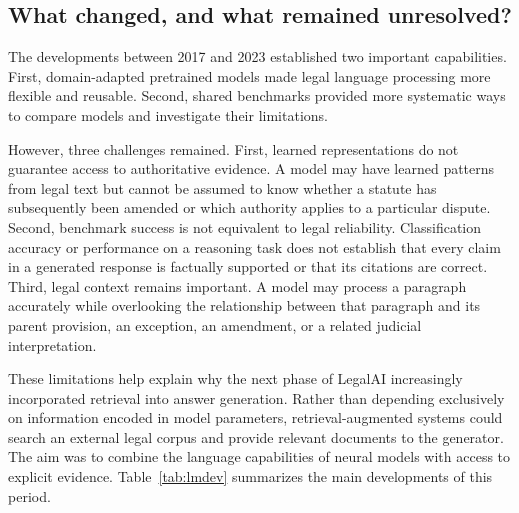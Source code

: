 \subsection{What changed, and what remained unresolved?}

The developments between 2017 and 2023 established two important capabilities. First, domain-adapted
pretrained models made legal language processing more flexible and reusable. Second, shared
benchmarks provided more systematic ways to compare models and investigate their limitations.

However, three challenges remained. First, learned representations do not guarantee access to
authoritative evidence. A model may have learned patterns from legal text but cannot be assumed to
know whether a statute has subsequently been amended or which authority applies to a particular
dispute. Second, benchmark success is not equivalent to legal reliability. Classification accuracy or
performance on a reasoning task does not establish that every claim in a generated response is
factually supported or that its citations are correct. Third, legal context remains important. A
model may process a paragraph accurately while overlooking the relationship between that paragraph and
its parent provision, an exception, an amendment, or a related judicial interpretation.

These limitations help explain why the next phase of LegalAI increasingly incorporated retrieval into
answer generation. Rather than depending exclusively on information encoded in model parameters,
retrieval-augmented systems could search an external legal corpus and provide relevant documents to
the generator. The aim was to combine the language capabilities of neural models with access to
explicit evidence. Table~\ref{tab:lmdev} summarizes the main developments of this period.

